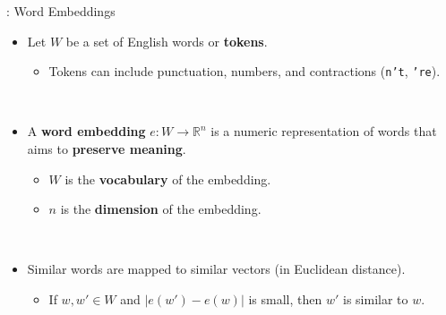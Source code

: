 \documentclass{beamer}
\begin{document}
\begin{frame}{\secname: Word Embeddings}
\begin{itemize}
\item 
Let $W$ be a set of English words or \textbf{tokens}.

\begin{itemize}
    \item Tokens can include punctuation, numbers, and contractions (\texttt{n't}, \texttt{'re}).
\end{itemize}

~\\

\item 
A \textbf{word embedding} $e: W \rightarrow \mathbb{R}^n$ is a numeric representation of words that aims to \textbf{preserve meaning}.
    \begin{itemize}
        \item $W$ is the \textbf{vocabulary} of the embedding.
        \item $n$ is the \textbf{dimension} of the embedding.
    \end{itemize}

~\\

\item Similar words are mapped to similar vectors (in Euclidean distance).
    \begin{itemize}
    \item
    If $w, w' \in W$ and $| e(w') - e(w) |$ is small, then $w'$ is similar to $w$.
    \end{itemize}
\end{itemize}
\end{frame}
\end{document}
